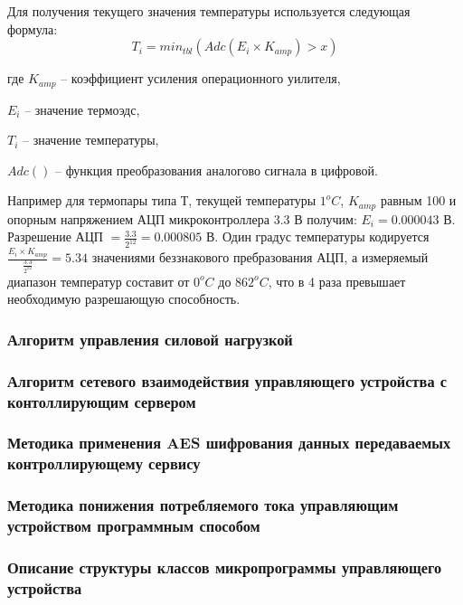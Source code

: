 Для получения текущего значения температуры используется следующая формула:
\begin{equation}
	T_i = min_{tbl}(Adc(E_i \times{} K_{amp}) > x) 
\end{equation}
\begin{ESKDexplanation}
	\item[где ]{} $K_{amp}$ -- коэффициент усиления операционного уилителя,
	\item{} $E_i$ -- значение термоэдс,
	\item{} $T_i$ -- значение температуры,
	\item{} $Adc()$ -- функция преобразования аналогово сигнала в цифровой.
\end{ESKDexplanation}


Например для термопары типа Т, текущей температуры $1^oC$, $K_{amp}$ равным 100 и опорным напряжением
АЦП микроконтроллера 3.3 В получим:
$E_i = 0.000043$ В. Разрешение АЦП $= \frac{3.3}{2^{12}} = 0.000805$ В. Один градус температуры
кодируется $\frac{E_i \times{} K_{amp}}{\frac{3.3}{2^{12}}} = 5.34 $ значениями
беззнакового пребразования АЦП, а измеряемый диапазон температур составит от $0^oC$ до $862^oC$,
что в 4 раза превышает необходимую разрешающую способность.


\subsubsection{Алгоритм управления силовой нагрузкой}

\subsubsection{Алгоритм сетевого взаимодействия управляющего устройства
с контоллирующим сервером}

\subsubsection{Методика применения AES шифрования данных передаваемых
контроллирующему сервису}

\subsubsection{Методика понижения потребляемого тока управляющим устройством
программным способом}

\subsubsection{Описание структуры классов микропрограммы управляющего устройства}
